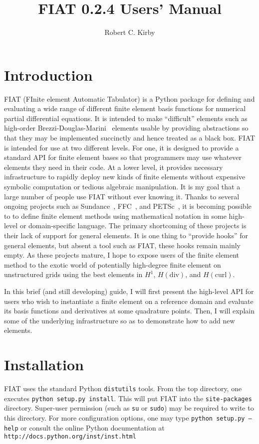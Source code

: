 \documentclass{fenicsmanual}
\title{FIAT 0.2.4 Users' Manual}
\author{Robert C. Kirby}
\begin{document}
\maketitle

\chapter{Introduction}
FIAT (FInite element Automatic Tabulator) is a Python package for
defining and evaluating a wide range of different finite element basis
functions for numerical partial differential equations.  It is
intended to make ``difficult'' elements such as high-order
Brezzi-Douglas-Marini~\cite{} elements usable by providing
abstractions so that they may be implemented succinctly and hence
treated as a black box.  FIAT is intended for use at two different
levels.  For one, it is designed to provide a standard API for finite
element bases so that programmers may use whatever elements they need
in their code.  At a lower level, it provides necessary infrastructure to
rapidly deploy new kinds of finite elements without expensive symbolic
computation or tedious algebraic manipulation.
It is my goal that a large number of people use FIAT without ever
knowing it.  Thanks to several ongoing projects such as
Sundance~\cite{}, FFC~\cite{}, and PETSc~\cite{}, it is becoming
possible to to define finite element methods using mathematical
notation in some high-level or domain-specific language.  The primary
shortcoming of these projects is their lack of support for general
elements.  It is one thing to ``provide hooks'' for general elements,
but absent a tool such as FIAT, these hooks remain mainly empty.  As
these projects mature, I hope to expose users of the finite element
method to the exotic world of potentially high-degree finite element
on unstructured grids using the best elements in $H^1$,
$H(\mathrm{div})$, and $H(\mathrm{curl})$.

In this brief (and still developing) guide, I will first
present the high-level API for users who wish to instantiate a finite
element on a reference domain and evaluate its basis functions and
derivatives at some quadrature points.  Then, I will explain some of
the underlying infrastructure so as to demonstrate how to add new
elements.

\chapter{Installation}
FIAT uses the standard Python \texttt{distutils} tools.  From the top
directory, one executes \texttt{python setup.py install}.  This will
put FIAT into the \texttt{site-packages} directory.  Super-user
permission (such as \texttt{su} or \texttt{sudo}) may be required to
write to this directory.  For more configuration options, one may type
\texttt{python setup.py --help} or consult the online Python
documentation at \texttt{http://docs.python.org/inst/inst.html}
\end{document}
